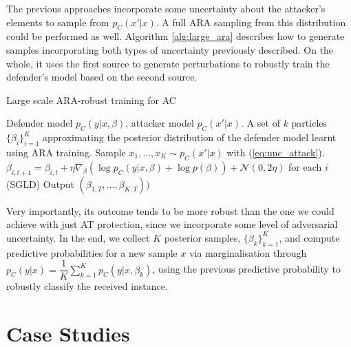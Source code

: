 The previous approaches incorporate some uncertainty about the attacker's elements to sample from $p_C(x' \vert x)$. A full ARA sampling from this distribution could be performed as well. 
Algorithm \ref{alg:large_ara} describes how to generate samples incorporating both types of uncertainty previously described. On the whole, it uses the first source to generate perturbations to robustly train the defender's model based on the second source. 


\begin{algorithm}[!ht] %
\caption{Large scale ARA-robust training for AC}  
\label{alg:large_ara}
\begin{algorithmic}
 Defender model $p_C(y|x,\beta)$, attacker model $p_C(x'|x)$. 
 A set of $k$ particles $\{\beta_i\}_{i=1}^{K}$  approximating the posterior distribution of the defender model learnt using ARA training.  
\State Sample $x_1, \ldots,  x_K \sim p_C(x' | x)$ with 
(\ref{eq:unc_attack}).
\State $\beta_{i,t+1} = \beta_{i,t} + \eta \nabla_\beta (\log p_C(y|x, \beta) + \log p(\beta)) + \mathcal{N}(0, 2\eta )$ for each $i$ (SGLD)
\EndFor
\State Output $(\beta_{1,T},...,\beta_{K,T}))$
\end{algorithmic}
\end{algorithm}

Very importantly, its outcome tends to be more robust  than
the one we could achieve with just AT protection, since we incorporate some level of adversarial uncertainty. In the end, we collect $K$ posterior samples, $\lbrace \beta_k \rbrace_{k=1}^K$, and compute predictive probabilities for a new sample $x$ via marginalisation
through
$p_C(y|x) = \dfrac{1}{K} \sum_{k=1}^K p_C(y|x, \beta_k)$,
using the previous predictive probability to robustly classify the
received instance.


 




\section{Case Studies}
\label{sec:conEx}

